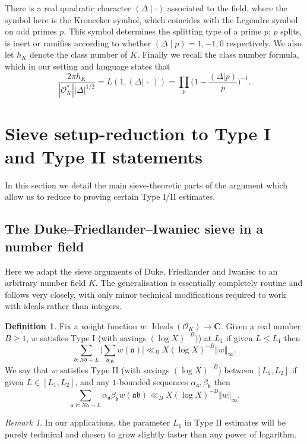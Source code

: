 \documentclass[11pt,reqno]{amsart}
\numberwithin{equation}{section}
\theoremstyle{definition}
\newtheorem{definition}[theorem]{Definition}
\theoremstyle{remark}
\newtheorem*{remark}{Remark}
\newcommand{\mf}{\mathfrak}
\renewcommand{\le}{\leqslant}
\renewcommand{\ge}{\geqslant}
\newcommand\C{\mathbf{C}}
\newcommand{\legendre}[2]{(#1 \mid #2)}
\newcommand\Ideals{\operatorname{Ideals}}
\renewcommand\O{\mathcal{O}}
\begin{document}
There is a real quadratic character $\legendre{\Delta}{\cdot}$ associated to the field, where the symbol here is the Kronecker symbol, which coincides with the Legendre symbol on odd primes $p$. This symbol determines the splitting type of a prime $p$; $p$ splits, is inert or ramifies according to whether $\legendre{\Delta}{p} = 1, -1, 0$ respectively. We also let $h_K$ denote the class number of $K$.  Finally we recall the class number formula, which in our setting and language states that 
\begin{equation}\label{class-number} \frac{2\pi h_K}{|\O_K^*| |\Delta|^{1/2}} =  L(1, (\Delta | \, \cdot \,)) = \prod_p \bigg(1 - \frac{(\Delta | p)}{p}\bigg)^{-1}.\end{equation}




\section{Sieve setup-reduction to Type I and Type II statements}\label{section3}


In this section we detail the main sieve-theoretic parts of the argument which allow us to reduce to proving certain Type I/II estimates. 

\subsection{The Duke--Friedlander--Iwaniec sieve in a number field}
\label{DFI-sec}
Here we adapt the sieve arguments of Duke, Friedlander and Iwaniec to an arbitrary number field $K$. The generalisation is essentially completely routine and follows \cite[Section 6]{DFI95} very closely, with only minor technical modifications required to work with ideals rather than integers.

\begin{definition}\label{def:input-estim} Fix a weight function $w : \Ideals(\O_K) \rightarrow \C$. Given a real number $B \ge 1$, $w$ satisfies Type I (with savings $(\log X)^{-B})$) at $L_1$ if given $L \le L_1$ then 
\begin{equation}\label{typeI-def} \sum_{\mf{d} : N\mf{d} \sim L} \Big|  \sum_{ \mf{d} | \mf{a}} w(\mf{a})\Big| \ll_B X(\log X)^{-B} \Vert w \Vert_{\infty}. \end{equation}
We say that $w$ satisfies Type II (with savings $(\log X)^{-B}$) between $[L_1,L_2]$ if given $L\in [L_1,L_2]$, and any $1$-bounded sequences $\alpha_{\mf{a}},\beta_{\mf{b}}$ then 
\begin{equation}\label{typeII-def} \sum_{\mf{a}, \mf{b}: N\mf{a} \sim  L } \alpha_{\mf{a}} \beta_{\mf{b}} w(\mf{a} \mf{b})\ll_{B} X(\log X)^{-B}\Vert w \Vert_{\infty}.\end{equation}  

\end{definition}
\begin{remark}
In our applications, the parameter $L_1$ in Type II estimates will be purely technical and chosen to grow slightly faster than any power of logarithm. 
\end{remark}
\end{document}
